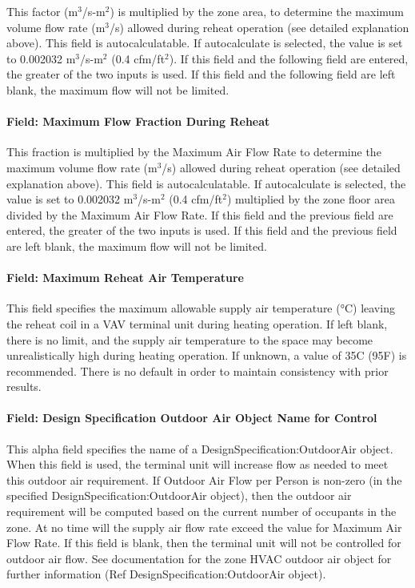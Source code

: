 This factor (m\(^{3}\)/s-m\(^{2}\)) is multiplied by the zone area, to determine the maximum volume flow rate (m\(^{3}\)/s) allowed during reheat operation (see detailed explanation above). This field is autocalculatable. If autocalculate is selected, the value is set to 0.002032 m\(^{3}\)/s-m\(^{2}\) (0.4 cfm/ft\(^{2}\)). If this field and the following field are entered, the greater of the two inputs is used. If this field and the following field are left blank, the maximum flow will not be limited.

\paragraph{Field: Maximum Flow Fraction During Reheat}\label{field-maximum-flow-fraction-during-reheat-000}

This fraction is multiplied by the Maximum Air Flow Rate to determine the maximum volume flow rate (m\(^{3}\)/s) allowed during reheat operation (see detailed explanation above). This field is autocalculatable. If autocalculate is selected, the value is set to 0.002032 m\(^{3}\)/s-m\(^{2}\) (0.4 cfm/ft\(^{2}\)) multiplied by the zone floor area divided by the Maximum Air Flow Rate. If this field and the previous field are entered, the greater of the two inputs is used. If this field and the previous field are left blank, the maximum flow will not be limited.

\paragraph{Field: Maximum Reheat Air Temperature}\label{field-maximum-reheat-air-temperature-000}

This field specifies the maximum allowable supply air temperature (°C) leaving the reheat coil in a VAV terminal unit during heating operation. If left blank, there is no limit, and the supply air temperature to the space may become unrealistically high during heating operation. If unknown, a value of 35C (95F) is recommended. There is no default in order to maintain consistency with prior results.

\paragraph{Field: Design Specification Outdoor Air Object Name for Control}\label{field-design-specification-outdoor-air-object-name-for-control}

This alpha field specifies the name of a DesignSpecification:OutdoorAir object. When this field is used, the terminal unit will increase flow as needed to meet this outdoor air requirement. If Outdoor Air Flow per Person is non-zero (in the specified DesignSpecification:OutdoorAir object), then the outdoor air requirement will be computed based on the current number of occupants in the zone. At no time will the supply air flow rate exceed the value for Maximum Air Flow Rate. If this field is blank, then the terminal unit will not be controlled for outdoor air flow. See documentation for the zone HVAC outdoor air object for further information (Ref DesignSpecification:OutdoorAir object).

